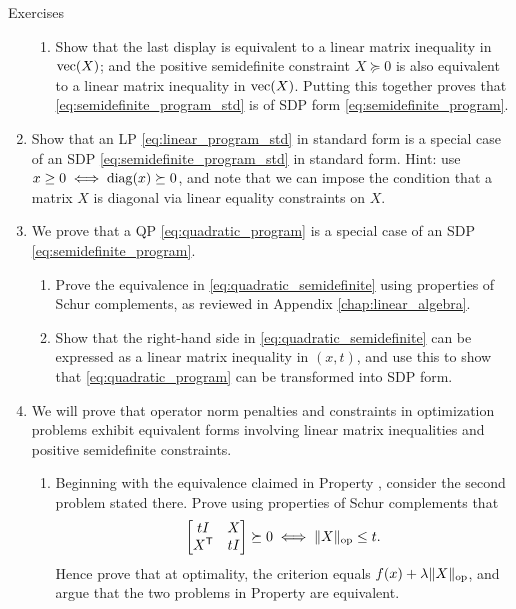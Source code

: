 \begin{xcb}{Exercises}
\begin{enumerate}[label=\thechapter.\arabic*]
\begin{enumerate}[label=\alph*.]
\item Show that the last display is equivalent to a linear matrix inequality 
  in $\operatorname{vec}(X)$; and the positive semidefinite constraint $X \succeq 0$ is also
  equivalent to a linear matrix inequality in $\operatorname{vec}(X)$. Putting this together
  proves that \eqref{eq:semidefinite_program_std} is of SDP form
  \eqref{eq:semidefinite_program}.      
\end{enumerate}

\item \label{ex:lps_are_sdps_std} 
  Show that an LP \eqref{eq:linear_program_std} in standard form is a special case
  of an SDP \eqref{eq:semidefinite_program_std} in standard form. Hint: use $x 
  \geq 0 \iff \operatorname{diag}(x) \succeq 0$, and note that we can impose the condition
  that a matrix $X$ is diagonal via linear equality constraints on $X$.   

\item \label{ex:qps_are_sdps}
  We prove that a QP \eqref{eq:quadratic_program} is a special case of an SDP
  \eqref{eq:semidefinite_program}. 

\begin{enumerate}[label=\alph*.]
\item Prove the equivalence in \eqref{eq:quadratic_semidefinite} using
  properties of Schur complements, as reviewed in Appendix
  \ref{chap:linear_algebra}. 

\item Show that the right-hand side in \eqref{eq:quadratic_semidefinite} can be
  expressed as a linear matrix inequality in $(x,t)$, and use this to show that  
  \eqref{eq:quadratic_program} can be transformed into SDP form.
\end{enumerate}

\item \label{ex:operator_norm_semidefinite}
  We will prove that operator norm penalties and constraints in optimization 
  problems exhibit equivalent forms involving linear matrix inequalities and 
  positive semidefinite constraints. 

\begin{enumerate}[label=\alph*.]
\item Beginning with the equivalence claimed in Property
  , consider the second problem stated 
  there. Prove using properties of Schur complements that
  \[
  \begin{bmatrix} t I & X \\ X^{\mathsf{T}} & t I \end{bmatrix} \succeq 0 
  \iff \|X\|_{\mathrm{op}} \leq t.
  \]
  Hence prove that at optimality, the criterion equals $f(x) + \lambda
  \|X\|_{\mathrm{op}}$, and argue that the two problems in Property
   are equivalent.    


\end{enumerate}
\end{enumerate}
\end{xcb}
